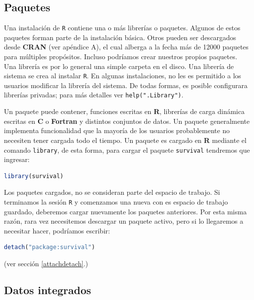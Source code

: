\documentclass[spanish]{extbook}
\numberwithin{equation}{section}
\numberwithin{figure}{section}
\begin{document}
\subsection{Paquetes}\label{paquetes}

Una instalación de \texttt{R} contiene una o más librerías o paquetes. Algunos
de estos paquetes forman parte de la instalación básica.  Otros pueden ser
descargados desde \textbf{CRAN} (ver apéndice A), el cual alberga a la fecha
más de 12000 paquetes para múltiples propósitos.  Incluso podríamos crear
nuestros propios paquetes. Una librería es por lo general una simple carpeta en
el disco. Una librería de sistema se crea al instalar \texttt{R}.  En algunas
instalaciones, no les es permitido a los usuarios modificar la librería del
sistema. De todas formas, es posible configurara librerías privadas; para más
detalles ver \texttt{help(".Library")}.

Un paquete puede contener, funciones escritas en \textbf{R}, librerías de carga
dinámica escritas en \textbf{C} o \textbf{Fortran} y distintos conjuntos de
datos.  Un paquete generalmente implementa funcionalidad que la mayoría de los
usuarios probablemente no necesiten tener cargada todo el tiempo. Un paquete es
cargado en \textbf{R} mediante el comando \texttt{library}, de esta forma, para
cargar el paquete \texttt{survival} tendremos que ingresar:

\begin{lstlisting}[language=R]
library(survival)
\end{lstlisting}

Los paquetes cargados, no se consideran parte del espacio de trabajo. Si
terminamos la sesión \texttt{R} y comenzamos una nueva con es espacio de
trabajo guardado, deberemos cargar nuevamente los paquetes anteriores.  Por
esta misma razón, rara vez necesitemos descargar un paquete activo, pero si lo
llegaremos a necesitar hacer, podríamos escribir:

\begin{lstlisting}[language=R]
detach("package:survival")
\end{lstlisting}

(ver sección \ref{attachdetach}.)

\subsection{Datos integrados}
\end{document}
